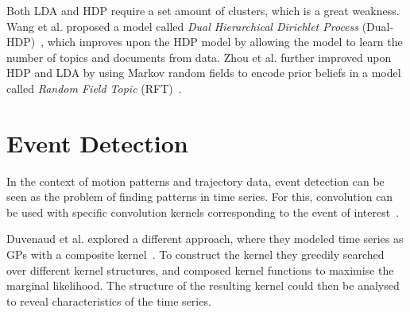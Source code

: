 Both LDA and HDP require a set amount of clusters, which is a great
weakness. Wang et al. proposed a model called \textit{Dual Hierarchical Dirichlet
Process} (Dual-HDP)~\cite{Wang2008Jun}, which improves upon the HDP model
by allowing the model to learn the number of topics and documents from
data. Zhou et al. further improved upon HDP and LDA by using Markov random
fields to encode prior beliefs in a model called \textit{Random Field
  Topic} (RFT)~\cite{Zhou2011Jun}.

\section{Event Detection}
In the context of motion patterns and trajectory data, event detection
can be seen as the problem of finding patterns in time
series. For this, convolution can be used with specific convolution
kernels corresponding to the event of interest~\cite{smith1997scientist}.

Duvenaud et al. explored a different approach, where they modeled
time series as GPs with a composite kernel~\cite{duvenaud2013structure}. To construct the
kernel they greedily searched over different kernel structures,
and composed kernel functions to maximise the marginal likelihood.
The structure of the resulting kernel could then be analysed to reveal
characteristics of the time series.